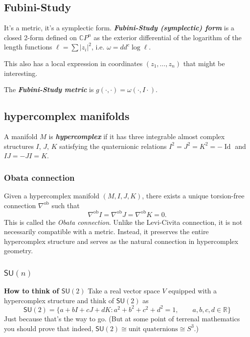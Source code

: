 \subsection{Fubini-Study}
It's a metric, it's a symplectic form. \textit{\textbf{Fubini-Study (symplectic) form}} is a closed 2-form defined on \(\mathbb{C}P^{n}\) as the exterior differential of the logarithm of the length functions \(\ell=\sum |z_i|^2\), i.e. \(\omega=dd^c \operatorname{log} \ell\).

This also has a local expression in coordinates \((z_1,\ldots,z_n)\) that might be interesting.

The \textit{\textbf{Fubini-Study metric}} is \(g(\cdot ,\cdot )=\omega(\cdot ,I\cdot )\).

\subsection{hypercomplex manifolds}

\begin{defn}\leavevmode
	A manifold $M$ is \textit{\textbf{hypercomplex}} if it has three integrable almost complex structures  $I$,  $J$, $K$ satisfying the quaternionic relations $I^2=J^2=K^2=-\operatorname{Id}$ and $I J=-J I=K$.
\end{defn}

\subsubsection{Obata connection}

\begin{remark}
    Given a hypercomplex manifold $(M, I, J, K)$, there exists a unique torsion-free connection $\nabla^{\operatorname{ob}}$ such that
    \[
    \nabla^{\operatorname{ob}} I = \nabla^{\operatorname{ob}} J = \nabla^{\operatorname{ob}} K = 0.
    \]
    This is called the \textit{Obata connection}. Unlike the Levi-Civita connection, it is not necessarily compatible with a metric. Instead, it preserves the entire hypercomplex structure and serves as the natural connection in hypercomplex geometry.
\end{remark}

\subsubsection{\(\mathsf{SU}(n)\)}

\textbf{How to think of \(\mathsf{SU}(2)\)} Take a real vector space \(V\) equipped with a hypercomplex structure and think of \(\mathsf{SU}(2)\) as
\[\mathsf{SU}(2)=\{a+b I+c J+ d K: a^2+b^2+c^2+d^2=1,\qquad a,b,c,d \in \mathbb{R} \}\]
Just because that's the way to go. (But at some point of terrenal mathematics you should prove that indeed, \(\mathsf{SU}(2)\cong \text{unit quaternions} \cong S^3\).)

